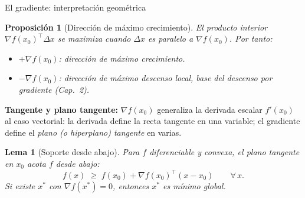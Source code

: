 \documentclass[10pt,aspectratio=169]{beamer}
\theoremstyle{definition}
\theoremstyle{plain}
\newtheorem{lema}{Lema}
\newtheorem{prop}{Proposición}
\begin{document}
\begin{frame}[t]{El gradiente: interpretación geométrica}
  \begin{prop}[Dirección de máximo crecimiento]
    El producto interior $\nabla f(x_{0})^{\top}\Delta x$ se maximiza cuando
    $\Delta x$ es paralelo a $\nabla f(x_{0})$. Por tanto:
    \begin{itemize}\setlength\itemsep{0pt}
      \item $+\nabla f(x_{0})$: dirección de \emph{máximo crecimiento}.
      \item $-\nabla f(x_{0})$: dirección de \emph{máximo descenso local},
            base del descenso por gradiente (Cap.~2).
    \end{itemize}
  \end{prop}

  \vspace{0.15em}
  \textbf{Tangente y plano tangente:} $\nabla f(x_{0})$ generaliza la
  derivada escalar $f'(x_{0})$ al caso vectorial: la derivada define la recta
  tangente en una variable; el gradiente define el \emph{plano (o
  hiperplano) tangente} en varias.

  \vspace{0.15em}
  \begin{lema}[Soporte desde abajo]
    Para $f$ diferenciable y convexa, el plano tangente en $x_{0}$ acota
    $f$ desde abajo:
    \[
      f(x) \;\geq\; f(x_{0}) + \nabla f(x_{0})^{\top}(x-x_{0})
      \qquad \forall\,x.
    \]
    \emph{Si existe $x^{*}$ con $\nabla f(x^{*})=0$, entonces $x^{*}$ es
    mínimo global.}
  \end{lema}
\end{frame}
\end{document}
